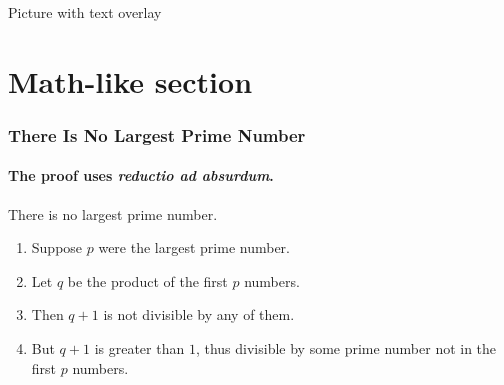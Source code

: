\documentclass[aspectratio=169,11pt]{beamer}
\begin{document}
\begin{frame}{Picture with text overlay}
\end{frame}

\section{Math-like section}
\begin{frame} 
\frametitle{There Is No Largest Prime Number} 
\framesubtitle{The proof uses \textit{reductio ad absurdum}.} 
\begin{theorem}
  There is no largest prime number.
\end{theorem} 
\begin{enumerate} 
  \item<1-| alert@1> Suppose $p$ were the largest prime number. 
  \item<2-> Let $q$ be the product of the first $p$ numbers. 
  \item<3-> Then $q+1$ is not divisible by any of them. 
  \item<1-> But $q + 1$ is greater than $1$, thus divisible by some prime number not in the first $p$ numbers.
\end{enumerate}
\end{frame}
\end{document}
